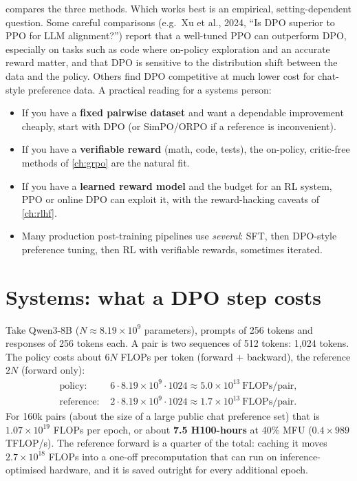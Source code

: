  compares the three methods. Which works best is an empirical, setting-dependent question. Some
careful comparisons (e.g.\ Xu et al., 2024, ``Is DPO superior to PPO for LLM alignment?'') report
that a well-tuned PPO can outperform DPO, especially on tasks such as code where on-policy
exploration and an accurate reward matter, and that DPO is sensitive to the distribution shift
between the data and the policy. Others find DPO competitive at much lower cost for chat-style
preference data. A practical reading for a systems person:
\begin{itemize}
\item If you have a \textbf{fixed pairwise dataset} and want a dependable improvement cheaply, start
  with DPO (or SimPO/ORPO if a reference is inconvenient).
\item If you have a \textbf{verifiable reward} (math, code, tests), the on-policy, critic-free
  methods of \cref{ch:grpo} are the natural fit.
\item If you have a \textbf{learned reward model} and the budget for an RL system, PPO or online DPO
  can exploit it, with the reward-hacking caveats of \cref{ch:rlhf}.
\item Many production post-training pipelines use \emph{several}: SFT, then DPO-style
  preference tuning, then RL with verifiable rewards, sometimes iterated.
\end{itemize}

\section{Systems: what a DPO step costs}\label{sec:dpo:systems}

\begin{napkinmath}
Take Qwen3-8B ($N\approx8.19\times10^9$ parameters), prompts of 256 tokens and responses of 256
tokens each. A pair is two sequences of 512 tokens: 1{,}024 tokens. The policy costs about $6N$
FLOPs per token (forward + backward), the reference $2N$ (forward only):
\begin{align*}
\text{policy: }& 6\cdot8.19\times10^9\cdot1024\approx5.0\times10^{13}\ \text{FLOPs/pair},\\
\text{reference: }& 2\cdot8.19\times10^9\cdot1024\approx1.7\times10^{13}\ \text{FLOPs/pair}.
\end{align*}
For 160k pairs (about the size of a large public chat preference set) that is $1.07\times10^{19}$
FLOPs per epoch, or about \textbf{7.5 H100-hours} at 40\% MFU
($0.4\times989$\,TFLOP/s). The reference forward is a quarter of the total: caching it moves
$2.7\times10^{18}$ FLOPs into a one-off precomputation that can run on inference-optimised
hardware, and it is saved outright for every additional epoch.
\end{napkinmath}

